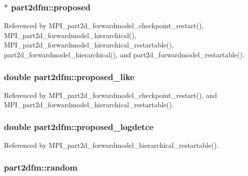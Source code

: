 \subsubsection[{\texorpdfstring{proposed}{proposed}}]{ $\ast$ part2dfm\+::proposed}\hypertarget{structpart2dfm_a1d002ed5bc6e090de2aed680a1596d1f}{}\label{structpart2dfm_a1d002ed5bc6e090de2aed680a1596d1f}


Referenced by M\+P\+I\+\_\+part2d\+\_\+forwardmodel\+\_\+checkpoint\+\_\+restart(), M\+P\+I\+\_\+part2d\+\_\+forwardmodel\+\_\+hierarchical(), M\+P\+I\+\_\+part2d\+\_\+forwardmodel\+\_\+hierarchical\+\_\+restartable(), part2d\+\_\+forwardmodel\+\_\+hierarchical(), and part2d\+\_\+forwardmodel\+\_\+restartable().

\subsubsection[{\texorpdfstring{proposed\+\_\+like}{proposed_like}}]{\setlength{\rightskip}{0pt plus 5cm}double part2dfm\+::proposed\+\_\+like}\hypertarget{structpart2dfm_ad8af80db96a56e597f77adfc1a816177}{}\label{structpart2dfm_ad8af80db96a56e597f77adfc1a816177}


Referenced by M\+P\+I\+\_\+part2d\+\_\+forwardmodel\+\_\+checkpoint\+\_\+restart(), and M\+P\+I\+\_\+part2d\+\_\+forwardmodel\+\_\+hierarchical\+\_\+restartable().

\subsubsection[{\texorpdfstring{proposed\+\_\+logdetce}{proposed_logdetce}}]{\setlength{\rightskip}{0pt plus 5cm}double part2dfm\+::proposed\+\_\+logdetce}\hypertarget{structpart2dfm_aa056d200c5db8c16d3d5a757916477ec}{}\label{structpart2dfm_aa056d200c5db8c16d3d5a757916477ec}


Referenced by M\+P\+I\+\_\+part2d\+\_\+forwardmodel\+\_\+hierarchical\+\_\+restartable().

\subsubsection[{\texorpdfstring{random}{random}}]{ part2dfm\+::random}\hypertarget{structpart2dfm_a4f3b1d16c58223eb6024decaf98b9e36}{}\label{structpart2dfm_a4f3b1d16c58223eb6024decaf98b9e36}


